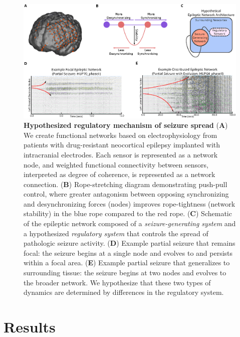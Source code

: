 \begin{figure}[H]
    \centering
    \includegraphics[width=\textwidth]{panel1.eps}
    \caption[Hypothetical regulatory mechansim of seizure spread]{\textbf{Hypothesized regulatory mechanism of seizure spread} (\textbf{A}) We create functional networks based on electrophysiology from patients with drug-resistant neocortical epilepsy implanted with intracranial electrodes. Each sensor is represented as a network node, and weighted functional connectivity between sensors, interpreted as degree of coherence, is represented as a network connection. (\textbf{B}) Rope-stretching diagram demonstrating push-pull control, where greater antagonism between opposing synchronizing and desynchronizing forces (nodes) improves rope-tightness (network stability) in the blue rope compared to the red rope. (\textbf{C}) Schematic of the epileptic network composed of a \textit{seizure-generating system} and a hypothesized \textit{regulatory system} that controls the spread of pathologic seizure activity. (\textbf{D}) Example partial seizure that remains focal: the seizure begins at a single node and evolves to and persists within a focal area. (\textbf{E}) Example partial seizure that generalizes to surrounding tissue: the seizure begins at two nodes and evolves to the broader network. We hypothesize that these two types of dynamics are determined by differences in the regulatory system. \label{ch5:fig1}}
\end{figure}


\section{Results}

